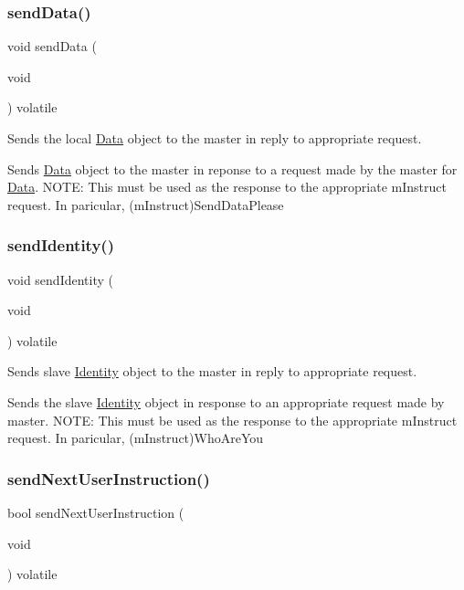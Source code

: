 \subsubsection{\texorpdfstring{sendData()}{sendData()}}
{\footnotesize\ttfamily void send\+Data (\begin{DoxyParamCaption}\item[{void}]{ }\end{DoxyParamCaption}) volatile}



Sends the local \mbox{\hyperlink{struct_data}{Data}} object to the master in reply to appropriate request. 

Sends \mbox{\hyperlink{struct_data}{Data}} object to the master in reponse to a request made by the master for \mbox{\hyperlink{struct_data}{Data}}. N\+O\+TE\+: This must be used as the response to the appropriate m\+Instruct request. In paricular, (m\+Instruct)Send\+Data\+Please \mbox{\label{class_master_a9ebd71ad45ea73524c87724b9c5e5e2f}} 
\subsubsection{\texorpdfstring{sendIdentity()}{sendIdentity()}}
{\footnotesize\ttfamily void send\+Identity (\begin{DoxyParamCaption}\item[{void}]{ }\end{DoxyParamCaption}) volatile}



Sends slave \mbox{\hyperlink{struct_identity}{Identity}} object to the master in reply to appropriate request. 

Sends the slave \mbox{\hyperlink{struct_identity}{Identity}} object in response to an appropriate request made by master. N\+O\+TE\+: This must be used as the response to the appropriate m\+Instruct request. In paricular, (m\+Instruct)Who\+Are\+You \mbox{\label{class_master_a6445732d38d6bac09ab8c8bd66bd4e2a}} 
\subsubsection{\texorpdfstring{sendNextUserInstruction()}{sendNextUserInstruction()}}
{\footnotesize\ttfamily bool send\+Next\+User\+Instruction (\begin{DoxyParamCaption}\item[{void}]{ }\end{DoxyParamCaption}) volatile}



